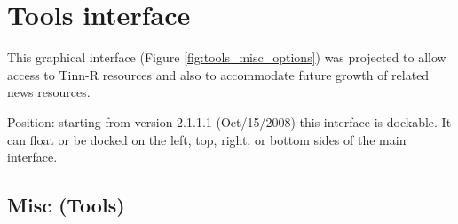 
\hypertarget{working_tools}{}
\section{Tools interface}

This graphical interface
(Figure \ref{fig:tools_misc_options})
was projected to allow access to Tinn-R resources
and also to accommodate future growth of related news resources.

Position: starting from version 2.1.1.1 (Oct/15/2008) this interface is
dockable. It can float or be docked on the left, top, right, or bottom
sides of the main interface.

\hypertarget{working_tools_misc}{}
\subsection{Misc (Tools)}

